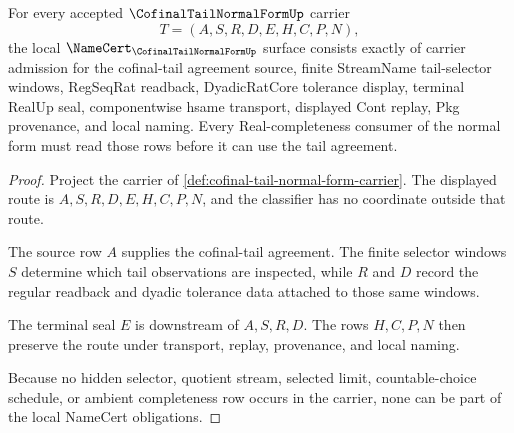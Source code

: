 \begin{theorem}
\label{thm:cofinal-tail-normal-form-namecert-obligations}
For every accepted $\CofinalTailNormalFormUp$ carrier
$$
T=(A,S,R,D,E,H,C,P,N),
$$
the local $\NameCert_{\CofinalTailNormalFormUp}$ surface consists exactly of carrier admission for the cofinal-tail agreement source, finite StreamName tail-selector windows, RegSeqRat readback, DyadicRatCore tolerance display, terminal RealUp seal, componentwise hsame transport, displayed Cont replay, Pkg provenance, and local naming. Every Real-completeness consumer of the normal form must read those rows before it can use the tail agreement.
\end{theorem}
\begin{proof}
Project the carrier of \autoref{def:cofinal-tail-normal-form-carrier}. The displayed route is $A,S,R,D,E,H,C,P,N$, and the classifier has no coordinate outside that route.

The source row $A$ supplies the cofinal-tail agreement. The finite selector windows $S$ determine which tail observations are inspected, while $R$ and $D$ record the regular readback and dyadic tolerance data attached to those same windows.

The terminal seal $E$ is downstream of $A,S,R,D$. The rows $H,C,P,N$ then preserve the route under transport, replay, provenance, and local naming.

Because no hidden selector, quotient stream, selected limit, countable-choice schedule, or ambient completeness row occurs in the carrier, none can be part of the local NameCert obligations.
\end{proof}

